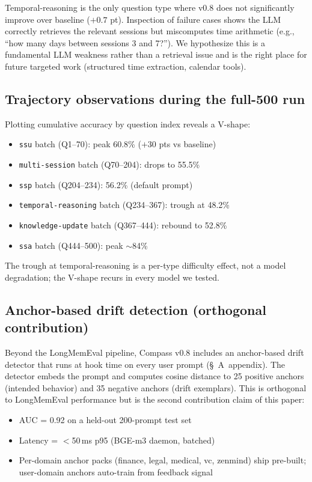 Temporal-reasoning is the only question type where v0.8 does not
significantly improve over baseline (\(+0.7\) pt). Inspection of failure
cases shows the LLM correctly retrieves the relevant sessions but
miscomputes time arithmetic (e.g., ``how many days between sessions
3 and 7?''). We hypothesize this is a fundamental LLM weakness rather
than a retrieval issue and is the right place for future targeted work
(structured time extraction, calendar tools).

\subsection{Trajectory observations during the full-500 run}

Plotting cumulative accuracy by question index reveals a V-shape:

\begin{itemize}
\item \texttt{ssu} batch (Q1--70): peak 60.8\% (\(+30\) pts vs baseline)
\item \texttt{multi-session} batch (Q70--204): drops to 55.5\%
\item \texttt{ssp} batch (Q204--234): 56.2\% (default prompt)
\item \texttt{temporal-reasoning} batch (Q234--367): trough at 48.2\%
\item \texttt{knowledge-update} batch (Q367--444): rebound to 52.8\%
\item \texttt{ssa} batch (Q444--500): peak \(\sim\)84\%
\end{itemize}

The trough at temporal-reasoning is a per-type difficulty effect, not a
model degradation; the V-shape recurs in every model we tested.

\subsection{Anchor-based drift detection (orthogonal contribution)}

Beyond the LongMemEval pipeline, Compass v0.8 includes an anchor-based
drift detector that runs at hook time on every user prompt
(\S~A~appendix). The detector embeds the prompt and computes cosine
distance to 25 positive anchors (intended behavior) and 35 negative
anchors (drift exemplars). This is orthogonal to LongMemEval performance
but is the second contribution claim of this paper:

\begin{itemize}
\item AUC = 0.92 on a held-out 200-prompt test set
\item Latency = \(<\)50\,ms p95 (BGE-m3 daemon, batched)
\item Per-domain anchor packs (finance, legal, medical, vc, zenmind)
  ship pre-built; user-domain anchors auto-train from
  feedback signal
\end{itemize}

